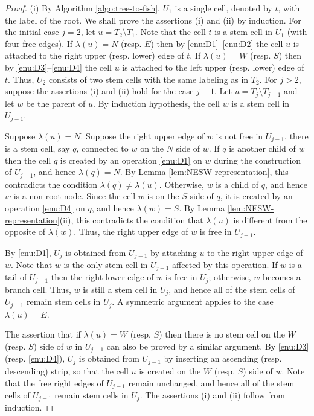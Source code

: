 \documentclass[a4paper,11pt,reqno]{amsart}
\theoremstyle{definition}
\numberwithin{equation}{section}
\begin{document}
\begin{proof} (i) By Algorithm \ref{algo:tree-to-fish}, $U_1$ is a single cell, denoted by $t$, with the label of the root. We shall prove the assertions (i) and (ii) by induction. For the initial case $j=2$, let $u=T_2\setminus T_1$.  Note that the cell $t$ is a stem cell in $U_1$ (with four free edges). If $\lambda(u)=N$ (resp. $E$) then by \ref{enu:D1}--\ref{enu:D2} the cell $u$ is attached to the right upper (resp. lower) edge of $t$. If $\lambda(u)=W$ (resp. $S$) then by \ref{enu:D3}--\ref{enu:D4} the cell $u$ is attached to the left upper (resp. lower) edge of $t$. Thus, $U_2$ consists of two stem cells with the same labeling as in $T_2$.  For $j>2$, suppose the assertions (i) and (ii) hold for the case $j-1$. Let $u=T_j\setminus T_{j-1}$ and let $w$ be the parent of $u$. By induction hypothesis, the cell $w$ is a stem cell in $U_{j-1}$. 

Suppose $\lambda(u)=N$. Suppose the right upper edge of $w$ is not free in $U_{j-1}$, there is a stem cell, say $q$, connected to $w$ on the $N$ side of $w$. If $q$ is another child of $w$ then the cell $q$ is created by an operation \ref{enu:D1} on $w$ during the construction of $U_{j-1}$, and hence $\lambda(q)=N$. By Lemma \ref{lem:NESW-representation}, this contradicts the condition $\lambda(q)\neq\lambda(u)$. Otherwise, $w$ is a child of $q$, and hence $w$ is a non-root node. Since the cell $w$ is on the $S$ side of $q$, it is created by an operation \ref{enu:D4} on $q$, and hence $\lambda(w)=S$. By Lemma \ref{lem:NESW-representation}(ii),  this contradicts the condition that $\lambda(u)$ is different from the opposite of $\lambda(w)$. Thus, the right upper edge of $w$ is free in $U_{j-1}$. 

By \ref{enu:D1}, $U_j$ is obtained from $U_{j-1}$ by attaching $u$ to the right upper edge of $w$. Note that $w$ is the only stem cell in $U_{j-1}$ affected by this operation. If $w$ is a tail of $U_{j-1}$ then the right lower edge of $w$ is free in $U_j$; otherwise, $w$ becomes a branch cell. Thus, $w$ is still a stem cell in $U_j$, and hence all of the stem cells of $U_{j-1}$ remain stem cells in $U_j$. A symmetric argument applies to the case $\lambda(u)=E$. 

The assertion that if $\lambda(u)=W$ (resp. $S$) then there is no stem cell on the $W$ (resp. $S$) side of $w$ in $U_{j-1}$ can also be proved by a similar argument. By \ref{enu:D3} (resp. \ref{enu:D4}), $U_j$ is obtained from $U_{j-1}$ by inserting an ascending (resp. descending) strip, so that the cell $u$ is created on the $W$ (resp. $S$) side of $w$. Note that the free right edges of $U_{j-1}$ remain unchanged, and hence all of the stem cells of $U_{j-1}$ remain stem cells in $U_j$. The assertions (i) and (ii) follow from induction.
\end{proof}
\end{document}
